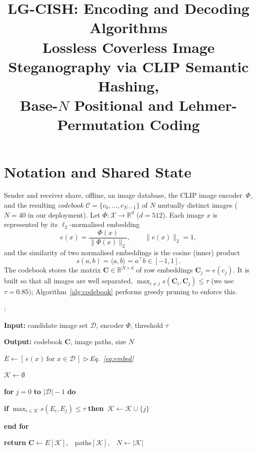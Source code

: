 \documentclass[11pt]{article}
\title{\textbf{LG-CISH: Encoding and Decoding Algorithms}\\[2pt]
\large Lossless Coverless Image Steganography via CLIP Semantic Hashing,\\
Base-$N$ Positional and Lehmer-Permutation Coding}
\author{}
\date{}
\newcounter{algln}
\newenvironment{pseudo}{%
  \begin{list}{\footnotesize\arabic{algln}:}{%
    \usecounter{algln}%
    \setlength{\leftmargin}{2.4em}\setlength{\labelwidth}{1.7em}%
    \setlength{\labelsep}{0.4em}\setlength{\itemsep}{1.5pt}%
    \setlength{\parsep}{0pt}\setlength{\topsep}{3pt}\small}%
}{\end{list}}
\newcommand{\kw}[1]{\textbf{#1}}
\newcommand{\Ind}{\hspace*{1.3em}}
\newcommand{\Cmt}[1]{\hfill{\footnotesize$\triangleright$\,\textit{#1}}}
\begin{document}
\maketitle

\section{Notation and Shared State}
Sender and receiver share, offline, an image database, the CLIP image
encoder~$\Phi$, and the resulting \emph{codebook}
$\mathcal{C}=\{c_0,\dots,c_{N-1}\}$ of $N$ mutually distinct images
($N{=}40$ in our deployment). Let $\Phi:\mathcal{X}\!\to\!\mathbb{R}^{d}$
($d{=}512$). Each image $x$ is represented by its $\ell_2$-normalised embedding
\begin{equation}
  e(x)=\frac{\Phi(x)}{\lVert\Phi(x)\rVert_2},\qquad \lVert e(x)\rVert_2=1,
  \label{eq:embed}
\end{equation}
and the similarity of two normalised embeddings is the cosine (inner) product
\begin{equation}
  s(a,b)=\langle a,b\rangle = a^{\!\top}b \in[-1,1].
  \label{eq:cos}
\end{equation}
The codebook stores the matrix $\mathbf{C}\in\mathbb{R}^{N\times d}$ of row
embeddings $\mathbf{C}_j=e(c_j)$. It is built so that all images are well
separated, $\max_{i\neq j}s(\mathbf{C}_i,\mathbf{C}_j)\le\tau$ (we use
$\tau{=}0.85$); Algorithm~\ref{alg:codebook} performs greedy pruning to enforce
this.

\begin{algorithm}[t]
\caption{Codebook construction}\label{alg:codebook}
\begin{pseudo}
\item \kw{Input:} candidate image set $\mathcal{D}$, encoder $\Phi$, threshold $\tau$
\item \kw{Output:} codebook $\mathbf{C}$, image paths, size $N$
\item $E \gets [\,e(x)\ \text{for } x\in\mathcal{D}\,]$ \Cmt{Eq.~\eqref{eq:embed}}
\item $\mathcal{K}\gets\emptyset$
\item \kw{for} $j=0$ \kw{to} $|\mathcal{D}|-1$ \kw{do}
\item \Ind \kw{if} $\max_{i\in\mathcal{K}} s(E_i,E_j)\le\tau$ \kw{then}
           $\ \mathcal{K}\gets\mathcal{K}\cup\{j\}$
\item \kw{end for}
\item \kw{return} $\mathbf{C}\gets E[\mathcal{K}]$,\ \ paths$[\mathcal{K}]$,\ \ $N\gets|\mathcal{K}|$
\end{pseudo}
\end{algorithm}
\end{document}
